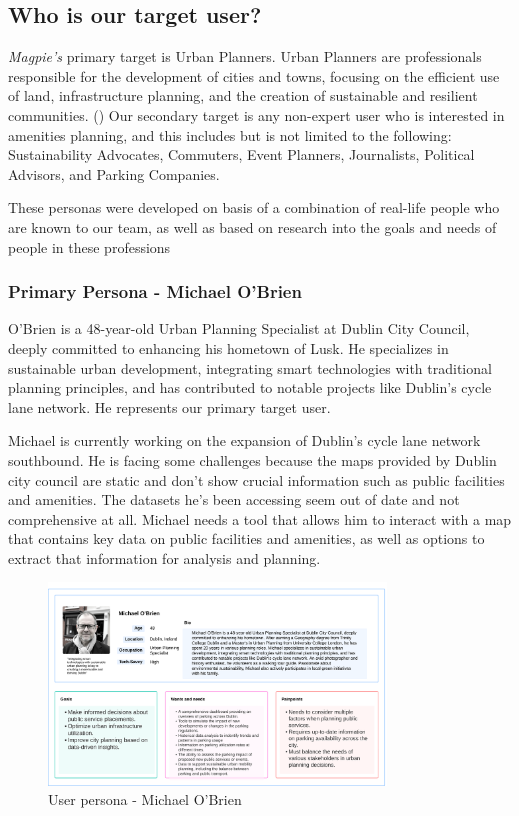 \documentclass[preview]{standalone}
\begin{document}
\subsection{Who is our target user?}
\textit{Magpie's} primary target is Urban Planners. Urban Planners are
professionals responsible for the development of cities and towns, focusing on
the efficient use of land, infrastructure planning, and the creation of
sustainable and resilient communities. (\cite{fischler2012fifty}) Our secondary
target is any non-expert user who is interested in amenities planning, and this
includes but is not limited to the following: Sustainability Advocates,
Commuters, Event Planners, Journalists, Political Advisors, and Parking
Companies.

These personas were developed on basis of a combination of real-life people who
are known to our team, as well as based on research into the goals and needs of
people in these professions

\subsubsection{Primary Persona - Michael O'Brien}
O'Brien is a 48-year-old Urban Planning Specialist at Dublin City Council,
deeply committed to enhancing his hometown of Lusk. He specializes in
sustainable urban development, integrating smart technologies with traditional
planning principles, and has contributed to notable projects like Dublin's cycle
lane network. He represents our primary target user.

Michael is currently working on the expansion of Dublin's cycle lane network
southbound. He is facing some challenges because the maps provided by Dublin
city council are static and don't show crucial information such as public
facilities and amenities. The datasets he's been accessing seem out of date and
not comprehensive at all. Michael needs a tool that allows him to interact with
a map that contains key data on public facilities and amenities, as well as
options to extract that information for analysis and planning.

\begin{figure}[htbp]
    \centering{}{}
    \includegraphics[width=0.8\textwidth]{images/michael-obrien-userpersona.png}
    \caption{User persona - Michael O'Brien}
\end{figure}
\end{document}
